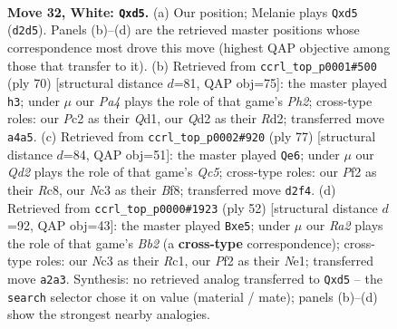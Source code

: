 \documentclass[11pt]{article}
\begin{document}
\clearpage

\begin{figure}[p]\centering
\begin{subfigure}{0.46\textwidth}\centering
\resizebox{\linewidth}{!}{%
\newchessgame
\chessboard[
  setfen={r2qrb2/ppp4k/5pp1/3b3p/P7/2N3P1/RPPQ1P1P/6K1 w - - 0 32},
  showmover=false,
  pgfstyle=straightmove, color=movearrow, markmove={d2-d5}
]}
\caption{}
\end{subfigure}\hfill
\begin{subfigure}{0.46\textwidth}\centering
\resizebox{\linewidth}{!}{%
\newchessgame
\chessboard[
  setfen={6k1/5p2/1q1r2pp/p1p5/3b4/1P3NP1/P2R1P1P/3Q2K1 w - - 2 36},
  showmover=false,
  pgfstyle=straightmove, color=movearrow, markmove={h2-h3}
]}
\caption{}
\end{subfigure}
\\[4pt]
\begin{subfigure}{0.46\textwidth}\centering
\resizebox{\linewidth}{!}{%
\newchessgame
\chessboard[
  setfen={2r2bk1/r4p1p/6p1/2p1P3/2qnBP1P/2B3P1/1R5K/2R1Q3 b - - 6 39},
  showmover=false,
  pgfstyle=straightmove, color=movearrow, markmove={c4-e6}
]}
\caption{}
\end{subfigure}\hfill
\begin{subfigure}{0.46\textwidth}\centering
\resizebox{\linewidth}{!}{%
\newchessgame
\chessboard[
  setfen={3rrn1k/2q3pp/1p3p2/p3b3/P1P1R3/1Q5P/1B3PP1/2R1N1K1 w - - 0 27},
  showmover=false,
  pgfstyle=straightmove, color=movearrow, markmove={b2-e5}
]}
\caption{}
\end{subfigure}
\caption{\textbf{Move 32, White: \texttt{Qxd5}.} (a) Our position; Melanie plays \texttt{Qxd5} (\texttt{d2d5}). Panels (b)--(d) are the retrieved master positions whose correspondence most drove this move (highest QAP objective among those that transfer to it). (b) Retrieved from \texttt{ccrl\_top\_p0001\#500} (ply 70) [structural distance $d$=81, QAP obj=75]: the master played \texttt{h3}; under $\mu$ our \emph{Pa4} plays the role of that game's \emph{Ph2}; cross-type roles: our \emph{P}c2 as their \emph{Q}d1, our \emph{Q}d2 as their \emph{R}d2; transferred move \texttt{a4a5}. (c) Retrieved from \texttt{ccrl\_top\_p0002\#920} (ply 77) [structural distance $d$=84, QAP obj=51]: the master played \texttt{Qe6}; under $\mu$ our \emph{Qd2} plays the role of that game's \emph{Qc5}; cross-type roles: our \emph{P}f2 as their \emph{R}c8, our \emph{N}c3 as their \emph{B}f8; transferred move \texttt{d2f4}. (d) Retrieved from \texttt{ccrl\_top\_p0000\#1923} (ply 52) [structural distance $d$=92, QAP obj=43]: the master played \texttt{Bxe5}; under $\mu$ our \emph{Ra2} plays the role of that game's \emph{Bb2} (a \textbf{cross-type} correspondence); cross-type roles: our \emph{N}c3 as their \emph{R}c1, our \emph{P}f2 as their \emph{N}e1; transferred move \texttt{a2a3}. Synthesis: no retrieved analog transferred to \texttt{Qxd5} -- the \texttt{search} selector chose it on value (material / mate); panels (b)--(d) show the strongest nearby analogies.}
\label{fig:thought-m62}
\end{figure}
\end{document}
